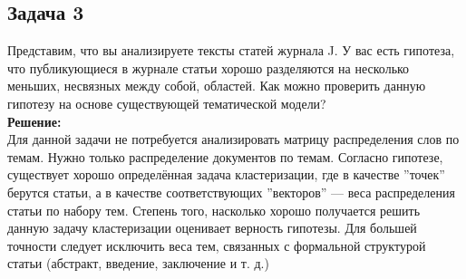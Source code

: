 \subsection*{Задача 3}
Представим, что вы анализируете тексты статей журнала J. У вас есть гипотеза, что публикующиеся в журнале статьи хорошо разделяются на несколько меньших, несвязных между собой, областей. Как можно проверить данную гипотезу на основе существующей тематической модели?\\
\textbf{Решение:}\\
Для данной задачи не потребуется анализировать матрицу распределения слов по темам. Нужно только распределение документов по темам. Согласно гипотезе, существует хорошо определённая задача кластеризации, где в качестве ''точек'' берутся статьи, а в качестве соответствующих ''векторов'' --- веса распределения статьи по набору тем. Степень того, насколько хорошо получается решить данную задачу кластеризации оценивает верность гипотезы. Для большей точности следует исключить веса тем, связанных с формальной структурой статьи (абстракт, введение, заключение и т. д.)
